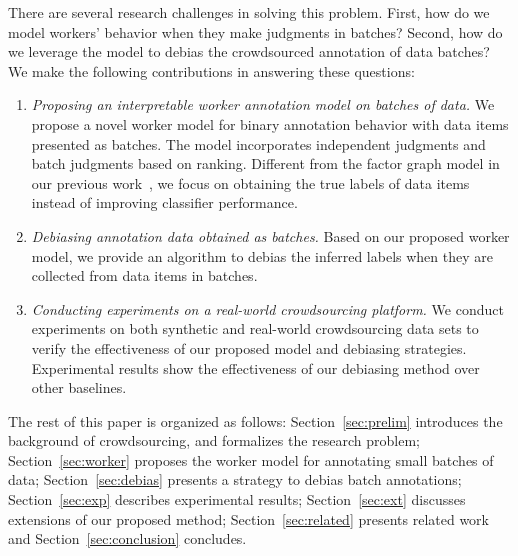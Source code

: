 There are several research challenges in solving this problem.
First, how do we model workers' behavior when they make judgments in batches?
Second, how do we leverage the model to debias the crowdsourced annotation of data batches?
We make the following contributions in answering these questions:
\begin{enumerate}
  \item \emph{Proposing an interpretable worker annotation model on batches of data.}
        We propose a novel worker model for binary annotation behavior with data items presented as batches.
        The model incorporates independent judgments and batch judgments based on ranking.
        Different from the factor graph model in our previous work~\cite{zhuang:wsdm2015},
        we focus on obtaining the true labels of data items instead of improving classifier performance.
  \item \emph{Debiasing annotation data obtained as batches.}
        Based on our proposed worker model, we provide an algorithm to debias the inferred labels
        when they are collected from data items in batches.
  \item \emph{Conducting experiments on a real-world crowdsourcing platform.}
        We conduct experiments on both synthetic and real-world crowdsourcing data sets
        to verify the effectiveness of our proposed model and debiasing strategies.
        Experimental results show the effectiveness of our debiasing method over other baselines.
\end{enumerate}

The rest of this paper is organized as follows:
Section~\ref{sec:prelim} introduces the background of crowdsourcing, and formalizes the research problem;
Section~\ref{sec:worker} proposes the worker model for annotating small batches of data;
Section~\ref{sec:debias} presents a strategy to debias batch annotations;
Section~\ref{sec:exp} describes experimental results;
Section~\ref{sec:ext} discusses extensions of our proposed method;
Section~\ref{sec:related} presents related work and Section~\ref{sec:conclusion} concludes.






